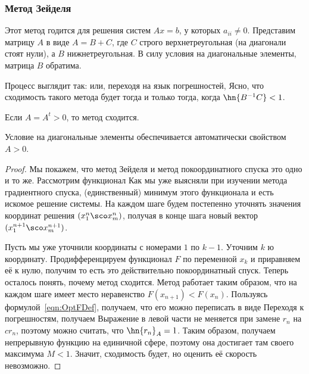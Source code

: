 \documentclass[a4paper]{article}
\begin{document}
\subsubsection{Метод Зейделя}

Этот метод годится для решения систем $Ax = b$, у которых $a_{ii} \ne
0$.  Представим матрицу $A$ в виде $A = B + C$, где $C$ строго
верхнетреугольная (на диагонали стоят нули), а $B$ нижнетреугольная. В
силу условия на диагональные элементы, матрица $B$ обратима.

Процесс выглядит так:  или, переходя на
язык погрешностей,   Ясно, что
сходимость такого метода будет тогда и только тогда, когда
$\hn{B^{-1}C} < 1$.

\begin{theorem}
Если $A = A^t > 0$, то метод сходится.
\end{theorem}

\begin{note}
Условие на диагональные элементы обеспечивается автоматически
свойством $A > 0$.
\end{note}

\begin{proof}
Мы покажем, что метод Зейделя и метод покоординатного спуска это одно
и то же.  Рассмотрим функционал   Как мы
уже выясняли при изучении метода градиентного спуска, (единственный)
минимум этого функционала и есть искомое решение системы. На каждом
шаге будем постепенно уточнять значения координат решения $(x_1^n\sco
x_m^n)$, получая в конце шага новый вектор $(x_1^{n+1}\sco
x_m^{n+1})$.

Пусть мы уже уточнили координаты с номерами $1$ по $k-1$. Уточним $k$
ю координату.  Продифференцируем функционал $F$ по переменной $x_k$ и
приравняем её к нулю, получим  то есть это действительно покоординатный спуск.  Теперь
осталось понять, почему метод сходится.  Метод работает таким образом,
что на каждом шаге имеет место неравенство $F(x_{n+1}) <
F(x_n)$. Пользуясь формулой~\eqref{eqn:OptFDef}, получаем, что его
можно переписать в виде   Переходя к погрешностям, получаем
  Выражение в левой
части не меняется при замене $r_n$ на $c r_n$, поэтому можно считать,
что $\hn{r_n}_A = 1$. Таким образом, получаем непрерывную функцию на
единичной сфере, поэтому она достигает там своего максимума $M <
1$. Значит, сходимость будет, но оценить её скорость невозможно.
\end{proof}
\end{document}
